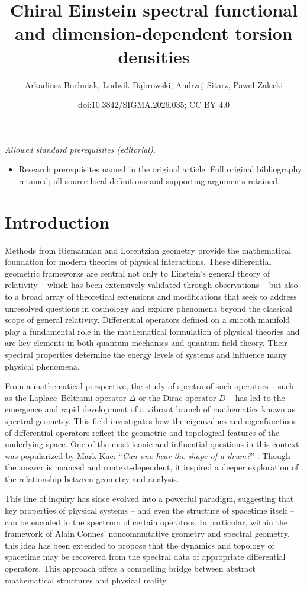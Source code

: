 \documentclass[10pt,a4paper]{amsart}
\title{Chiral Einstein spectral functional and dimension-dependent torsion densities}
\author{Arkadiusz Bochniak, Ludwik Dąbrowski, Andrzej Sitarz, Paweł Zalecki}
\date{doi:10.3842/SIGMA.2026.035; CC BY 4.0}
\numberwithin{equation}{section}
\theoremstyle{definition}
\begin{document}
\maketitle
\noindent\textit{Allowed standard prerequisites (editorial).}\begin{itemize}
\item Research prerequisites named in the original article. Full original bibliography retained; all source-local definitions and supporting arguments retained.
\end{itemize}\medskip
\section{Introduction}

Methods from Riemannian and Lorentzian geometry provide the mathematical foundation for modern theories of physical interactions. These differential geometric frameworks are central not only to Einstein's general theory of relativity -- which has been extensively validated through observations -- but also to a broad array of theoretical extensions and modifications that seek to address unresolved questions in cosmology and explore phenomena beyond the classical scope of general relativity. Differential operators defined on a smooth manifold play a fundamental role in the mathematical formulation of physical theories and are key elements in both quantum mechanics and quantum field theory. Their spectral properties determine the energy levels of systems and influence many physical phenomena.

From a mathematical perspective, the study of spectra of such operators -- such as the Laplace--Beltrami operator $\Delta$ or the Dirac operator $D$ -- has led to the emergence and rapid development of a vibrant branch of mathematics known as spectral geometry. This field investigates how the eigenvalues and eigenfunctions of differential operators reflect the geometric and topological features of the underlying space. One of the most iconic and influential questions in this context was popularized by Mark Kac: ``{\it Can one hear the shape of a drum?}'' \cite{Kac}. Though the answer is nuanced and context-dependent, it inspired a deeper exploration of the relationship between geometry and analysis.

This line of inquiry has since evolved into a powerful paradigm, suggesting that key properties of physical systems -- and even the structure of spacetime itself -- can be encoded in the spectrum of certain operators. In particular, within the framework of Alain Connes' noncommutative geometry \cite{Chamseddine:1996rw,Connes_book} and spectral geometry, this idea has been extended to propose that the dynamics and topology of spacetime may be recovered from the spectral data of appropriate differential operators. This approach offers a compelling bridge between abstract mathematical structures and physical reality.
\end{document}
